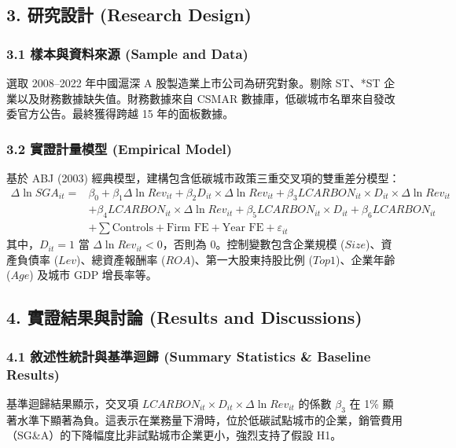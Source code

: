 \documentclass[11pt,a4paper]{article}
\begin{document}
\subsection{3. 研究設計 (Research Design)}

\subsubsection{3.1 樣本與資料來源 (Sample and Data)}
選取 2008--2022 年中國滬深 A 股製造業上市公司為研究對象。剔除 ST、*ST 企業以及財務數據缺失值。財務數據來自 CSMAR 數據庫，低碳城市名單來自發改委官方公告。最終獲得跨越 15 年的面板數據。

\subsubsection{3.2 實證計量模型 (Empirical Model)}
基於 ABJ (2003) 經典模型，建構包含低碳城市政策三重交叉項的雙重差分模型：
\begin{equation}
\begin{aligned}
\Delta \ln SGA_{it} = & \beta_0 + \beta_1 \Delta \ln Rev_{it} + \beta_2 D_{it} \times \Delta \ln Rev_{it} + \beta_3 LCARBON_{it} \times D_{it} \times \Delta \ln Rev_{it} \\
& + \beta_4 LCARBON_{it} \times \Delta \ln Rev_{it} + \beta_5 LCARBON_{it} \times D_{it} + \beta_6 LCARBON_{it} \\
& + \sum \text{Controls} + \text{Firm FE} + \text{Year FE} + \varepsilon_{it}
\end{aligned}
\end{equation}
其中，$D_{it} = 1$ 當 $\Delta \ln Rev_{it} < 0$，否則為 0。控制變數包含企業規模 ($Size$)、資產負債率 ($Lev$)、總資產報酬率 ($ROA$)、第一大股東持股比例 ($Top1$)、企業年齡 ($Age$) 及城市 GDP 增長率等。

\subsection{4. 實證結果與討論 (Results and Discussions)}

\subsubsection{4.1 敘述性統計與基準迴歸 (Summary Statistics \& Baseline Results)}
基準迴歸結果顯示，交叉項 $LCARBON_{it} \times D_{it} \times \Delta \ln Rev_{it}$ 的係數 $\beta_3$ 在 1\% 顯著水準下顯著為負。這表示在業務量下滑時，位於低碳試點城市的企業，銷管費用（SG\&A）的下降幅度比非試點城市企業更小，強烈支持了假設 H1。
\end{document}
